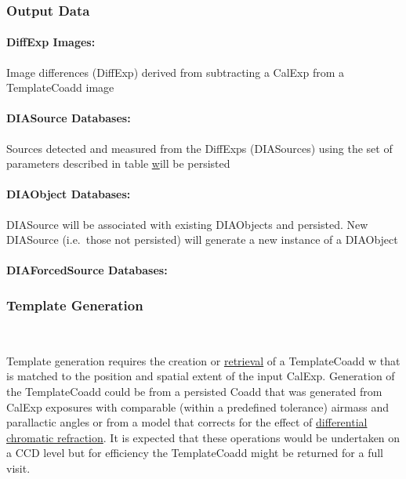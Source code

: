 \subsubsection{Output Data}
\label{sec:apADOutput}

\paragraph*{DiffExp Images:} Image differences (DiffExp) derived from subtracting a CalExp from a TemplateCoadd image 

\paragraph*{DIASource Databases:} Sources detected and measured from the DiffExps (DIASources) using the set of parameters described in table \hyperref[table:ap_features] will be persisted


\paragraph*{DIAObject Databases:} DIASource will be associated with existing DIAObjects and persisted. New DIASource (i.e.\ those not persisted) will generate a new instance of a DIAObject 

\paragraph*{DIAForcedSource Databases:}




\subsubsection{Template Generation}~
\label{sec:apCRTemplates}

Template generation requires the creation or \hyperref[sec:acRetrieveTemplate]{retrieval} of a TemplateCoadd w that is matched to the position and spatial extent of the input CalExp. Generation of the TemplateCoadd could be from a persisted Coadd that was generated from CalExp exposures with comparable (within a predefined tolerance) airmass and parallactic angles or from a model that corrects for the effect of  \hyperref[sec:acDCRTemplates]{differential chromatic refraction}. It is expected that these operations would be undertaken on a CCD level but for efficiency the TemplateCoadd might be returned for a full visit. 


